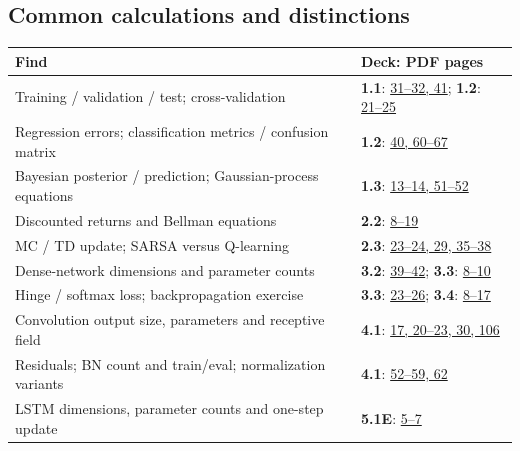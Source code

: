 \documentclass[10pt]{article}
\begin{document}
\subsection{Common calculations and distinctions}
\begin{longtable}{@{}P{.62\linewidth}P{.34\linewidth}@{}}
\toprule\textbf{Find} & \textbf{Deck: PDF pages}\\\midrule\endhead
Training / validation / test; cross-validation & \textbf{1.1}: \href{../Lecture\%20Slides/1.1.\%20Fundamentals.pdf\#page=31}{31--32, 41}; \textbf{1.2}: \href{../Lecture\%20Slides/1.2.\%20Shallow\%20Learning.pdf\#page=21}{21--25}\\[3pt]
Regression errors; classification metrics / confusion matrix & \textbf{1.2}: \href{../Lecture\%20Slides/1.2.\%20Shallow\%20Learning.pdf\#page=40}{40, 60--67}\\[3pt]
Bayesian posterior / prediction; Gaussian-process equations & \textbf{1.3}: \href{../Lecture\%20Slides/1.3.\%20Bayesian\%20Learning.pdf\#page=13}{13--14, 51--52}\\[3pt]
Discounted returns and Bellman equations & \textbf{2.2}: \href{../Lecture\%20Slides/2.2.\%20Markov\%20decision\%20processes.pdf\#page=8}{8--19}\\[3pt]
MC / TD update; SARSA versus Q-learning & \textbf{2.3}: \href{../Lecture\%20Slides/2.3.\%20Q-learning.pdf\#page=23}{23--24, 29, 35--38}\\[3pt]
Dense-network dimensions and parameter counts & \textbf{3.2}: \href{../Lecture\%20Slides/3.2.\%20Shallow\%20NN.pdf\#page=39}{39--42}; \textbf{3.3}: \href{../Lecture\%20Slides/3.3.\%20Deep\%20Learning\%20Fundamentals.pdf\#page=8}{8--10}\\[3pt]
Hinge / softmax loss; backpropagation exercise & \textbf{3.3}: \href{../Lecture\%20Slides/3.3.\%20Deep\%20Learning\%20Fundamentals.pdf\#page=23}{23--26}; \textbf{3.4}: \href{../Lecture\%20Slides/3.4.\%20Deep\%20Learning\%20Fundamentals\%20II.pdf\#page=8}{8--17}\\[3pt]
Convolution output size, parameters and receptive field & \textbf{4.1}: \href{../Lecture\%20Slides/4.1.\%20CNNs.pdf\#page=17}{17, 20--23, 30, 106}\\[3pt]
Residuals; BN count and train/eval; normalization variants & \textbf{4.1}: \href{../Lecture\%20Slides/4.1.\%20CNNs.pdf\#page=52}{52--59, 62}\\[3pt]
LSTM dimensions, parameter counts and one-step update & \textbf{5.1E}: \href{../Lecture\%20Slides/5.1.\%20Extra\%20Material.pdf\#page=5}{5--7}\\[3pt]

\end{longtable}
\end{document}
